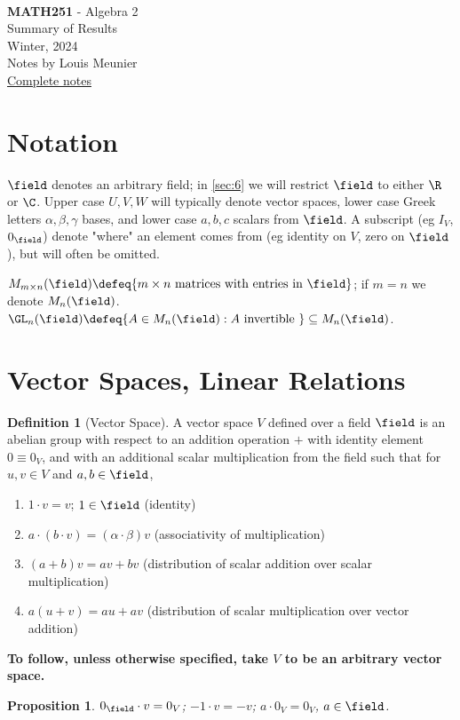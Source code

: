 \documentclass[12pt, oneside]{article}
\newcommand{\pageauthor}{Louis Meunier}
\newcommand{\pagetitle}{Algebra 2}
\newcommand{\pagesubtitle}{MATH251}
\newcommand{\pagedescription}{Summary of Results}
\newcommand{\pagesemester}{Winter, 2024 }
\newcommand{\thetitle}{
  \noindent
  \vspace*{5em}\\
  {\Large\textbf{\pagesubtitle} - \pagetitle}\\
  {\small{\pagedescription}}
  \vspace*{2em}\\
  {\small \pagesemester\\
  Notes by \pageauthor}\\
  {\small \href{https://notes.louismeunier.net/Algebra 2/algebra2.pdf}{Complete notes}}
}
\theoremstyle{definition}
\newtheorem{defn}{Definition}
\theoremstyle{plain}
\newtheorem{prop}{Proposition}
\theoremstyle{remark}
\let\origsection=\section
\renewcommand\section[1]{\origsection{#1}\label{sec:\thesection}}
\begin{document}
\thetitle
\tableofcontents
{}

\section{Notation}

$\field$ denotes an arbitrary field; in \cref{sec:6} we will restrict $\field$ to either $\R$ or $\C$. Upper case $U, V, W$ will typically denote vector spaces, lower case Greek letters $\alpha, \beta, \gamma$ bases, and lower case $a, b, c$ scalars from $\field$. A subscript (eg $I_V$, $0_\field$) denote "where" an element comes from (eg identity on $V$, zero on $\field$), but will often be omitted.

$M_{m \times n}(\field) \defeq \{m \times n \text{ matrices with entries in }\field \}$; if $m = n$ we denote $M_n(\field)$. $\GL_n(\field) \defeq \{A \in M_n(\field) : A \text{ invertible }\} \subseteq M_n(\field)$.

\section{Vector Spaces, Linear Relations}


\begin{defn}[Vector Space]
  A vector space $V$ defined over a field $\field$ is an abelian group with respect to an addition operation $+$ with identity element $0 \equiv 0_V$, and with an additional scalar multiplication from the field such that for $u, v \in V$ and $a, b\in \field$, \begin{enumerate}
    \item $1 \cdot v = v$; $1 \in \field$ (identity)
    \item $a \cdot (b \cdot v) = (\alpha \cdot \beta)v$ (associativity of multiplication)
    \item $(a+b)v = a v + b v$ (distribution of scalar addition over scalar multiplication)
    \item $a (u + v) = a u + av$ (distribution of scalar multiplication over vector addition)
  \end{enumerate}
\end{defn}

\textbf{To follow, unless otherwise specified, take $V$ to be an arbitrary vector space.}

\begin{prop}
  $0_\field \cdot v = 0_V$; $-1 \cdot v = -v$; $a\cdot 0_V = 0_V$, $a\in \field$.
\end{prop}
\end{document}
